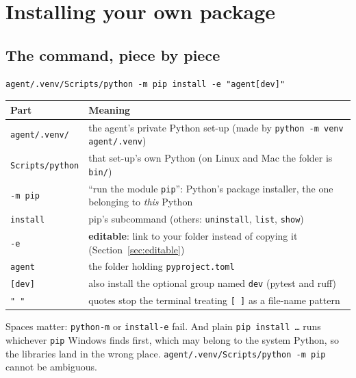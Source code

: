 \documentclass[11pt,a4paper]{article}
\begin{document}
\section{Installing your own package}
\subsection{The command, piece by piece}
\begin{lstlisting}
agent/.venv/Scripts/python -m pip install -e "agent[dev]"
\end{lstlisting}
\begin{center}
\renewcommand{\arraystretch}{1.15}
\begin{tabularx}{\textwidth}{l X}
\toprule
\textbf{Part} & \textbf{Meaning} \\
\midrule
\texttt{agent/.venv/} & the agent's private Python set-up (made by \texttt{python -m venv agent/.venv}) \\
\texttt{Scripts/python} & that set-up's own Python (on Linux and Mac the folder is \texttt{bin/}) \\
\texttt{-m pip} & ``run the module \texttt{pip}'': Python's package installer, the one belonging to \emph{this} Python \\
\texttt{install} & pip's subcommand (others: \texttt{uninstall}, \texttt{list}, \texttt{show}) \\
\texttt{-e} & \textbf{editable}: link to your folder instead of copying it (Section~\ref{sec:editable}) \\
\texttt{agent} & the folder holding \texttt{pyproject.toml} \\
\texttt{[dev]} & also install the optional group named \texttt{dev} (pytest and ruff) \\
\texttt{" "} & quotes stop the terminal treating \texttt{[ ]} as a file-name pattern \\
\bottomrule
\end{tabularx}
\end{center}

\begin{caution}
Spaces matter: \texttt{python-m} or \texttt{install-e} fail. And plain \texttt{pip install \ldots}
runs whichever \texttt{pip} Windows finds first, which may belong to the system Python, so the
libraries land in the wrong place. \texttt{agent/.venv/Scripts/python -m pip} cannot be ambiguous.
\end{caution}
\end{document}
